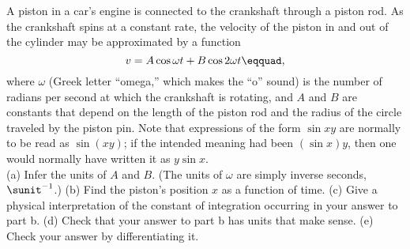 A piston in a car's engine is connected to the crankshaft through a
piston rod. As the crankshaft spins at a constant rate, the velocity
of the piston in and out of the cylinder may be approximated by
a function
\begin{equation*}
  v = A\cos\omega t+B\cos 2\omega t\eqquad,
\end{equation*}
where $\omega$ (Greek letter ``omega,'' which makes the ``o'' sound)
is the number of radians per second at which the crankshaft is rotating,
and $A$ and $B$ are constants that depend on the length of the piston
rod and the radius of the circle traveled by the piston pin. Note that expressions
of the form $\sin xy$ are normally to be read as $\sin(xy)$; if the intended meaning
had been $(\sin x)y$, then one would normally have written it as $y\sin x$.\\
(a) Infer the units of $A$ and $B$. (The units of $\omega$ are simply inverse
seconds, $\sunit^{-1}$.)\hwendpart
(b) Find the piston's position $x$ as a function of time.\answercheck\hwendpart
(c) Give a physical interpretation of the constant of integration occurring in
your answer to part b.\hwendpart
(d) Check that your answer to part b has units that make sense.\hwendpart
(e) Check your answer by differentiating it.
